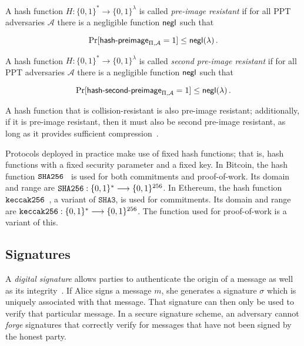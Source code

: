 


\begin{definition}
  A hash function $H: \{0, 1\}^* \longrightarrow \{0, 1\}^\lambda$ is called
  \emph{pre-image resistant} if for all PPT adversaries $\mathcal{A}$ there is a
  negligible function $\mathsf{negl}$ such that

  \[
  \Pr[\textsf{hash-preimage}_{\Pi,\mathcal{A}} = 1] \leq \mathsf{negl}(\lambda)\,.
  \]
\end{definition}

\begin{definition}
  A hash function $H: \{0, 1\}^* \longrightarrow \{0, 1\}^\lambda$ is called
  \emph{second pre-image resistant} if for all PPT adversaries $\mathcal{A}$
  there is a negligible function $\mathsf{negl}$ such that

  \[
  \Pr[\textsf{hash-second-preimage}_{\Pi,\mathcal{A}} = 1] \leq \mathsf{negl}(\lambda)\,.
  \]
\end{definition}

A hash function that is collision-resistant is also pre-image resistant; additionally, if it is pre-image resistant, then it must also be second pre-image resistant, as long as it provides sufficient compression~\cite{rogaway2004cryptographic}.

Protocols deployed in practice make use of fixed hash functions; that is, hash
functions with a fixed security parameter and a fixed key. In Bitcoin, the hash
function $\mathtt{SHA256}$~\cite{sha256} is used for both commitments and proof-of-work.
Its domain and range are
$\mathtt{SHA256}: \{0, 1\}^* \longrightarrow \{0, 1\}^{256}$. In Ethereum, the hash
function $\mathtt{keccak256}$~\cite{bertoni2008indifferentiability}, a variant of
$\texttt{SHA3}$, is used for commitments. Its domain and range are $\mathtt{keccak256}: \{0, 1\}^*
\longrightarrow \{0, 1\}^{256}$. The function used for proof-of-work is a
variant of this.

\subsection{Signatures}
A \emph{digital signature} allows parties to authenticate the origin of a
message as well as its integrity~\cite{katz}. If Alice signs a message $m$, she generates a
signature $\sigma$ which is uniquely associated with that message. That
signature can then only be used to verify that particular message. In a secure signature scheme, an adversary
cannot \emph{forge} signatures that correctly verify for messages that have not
been signed by the honest party.

